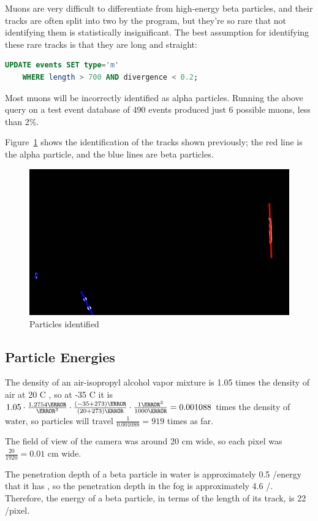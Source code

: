 \documentclass[notitlepage]{article}
\begin{document}
Muons are very difficult to differentiate from high-energy beta particles, and their tracks are often split into two by the program, but they're so rare that not identifying them is statistically insignificant.  The best assumption for identifying these rare tracks is that they are long and straight:
\begin{lstlisting}[language=SQL]
UPDATE events SET type='m' 
    WHERE length > 700 AND divergence < 0.2;
\end{lstlisting}

Most muons will be incorrectly identified as alpha particles.  Running the above query on a test event database of 490 events produced just 6 possible muons, less than 2\%.

Figure~\ref{fig:mask6} shows the identification of the tracks shown previously; the red line is the alpha particle, and the blue lines are beta particles.

\begin{figure}[h]
	\centering
	\includegraphics[width=.45\textwidth]{mask6}
	\caption{Particles identified\label{fig:mask6}}
\end{figure}

\subsection{Particle Energies}

The density of an air-isopropyl alcohol vapor mixture is 1.05 times the density of air at 20 \degree{}C \cite{isopropanol}, so at -35 \degree{}C it is $1.05 \cdot \frac{1.2754 \kilogram}{\metre^3} \cdot \frac{(-35+273) \kelvin}{(20+273) \kelvin} \cdot \frac{1 \metre^3}{1000 \kilogram} = 0.001088$ times the density of water, so particles will travel $\frac{1}{0.001088}=919$ times as far.

The field of view of the camera was around 20 cm wide, so each pixel was $\frac{20}{1920} = 0.01$ cm wide. 

The penetration depth of a beta particle in water is approximately 0.5 \centi{}\meter/\mega{}\electronvolt energy that it has \cite{penetration}, so the penetration depth in the fog is approximately 4.6 \meter/\mega{}\electronvolt.   Therefore, the energy of a beta particle, in terms of the length of its track, is 22 \electronvolt/pixel.
\end{document}
